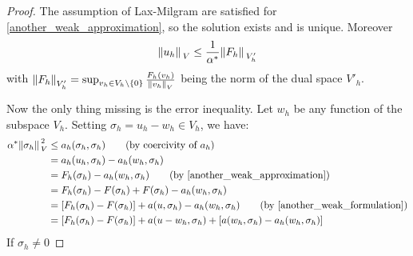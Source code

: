 \begin{proof}
    The assumption of Lax-Milgram are satisfied for \eqref{another_weak_approximation}, so the solution exists and is unique. Moreover
    \[
        \norm*{u_h}_V \leq \frac{1}{\alpha^*} \norm*{F_h}_{V'_h} 
    \]
    with \(\norm{F_h}_{V'_h} = \sup_{v_h \in V_h \backslash \left\{0\right\}} \frac{F_h(v_h)}{\norm{v_h}_V}\) being the norm of the dual space \(V'_h\).

    Now the only thing missing is the error inequality. Let \(w_h\) be any function of the subspace \(V_h\). Setting \(\sigma_h = u_h -w_h \in V_h\), we have:
    \begin{align*}
        \alpha^* \norm*{\sigma_h}^2_V &\leq a_h(\sigma_h, \sigma_h) \tag*{(by coercivity of \(a_h\))} \\
        &= a_h(u_h, \sigma_h) - a_h(w_h, \sigma_h) \\
        &= F_h(\sigma_h) - a_h(w_h, \sigma_h) \tag*{(by \eqref{another_weak_approximation})} \\
        &= F_h(\sigma_h) - F(\sigma_h) + F(\sigma_h) - a_h(w_h, \sigma_h) \\
        &= \left[F_h(\sigma_h)-F(\sigma_h)\right] + a(u, \sigma_h) - a_h(w_h, \sigma_h) \tag*{(by \eqref{another_weak_formulation})} \\
        &= \left[F_h(\sigma_h) - F(\sigma_h)\right] + a(u-w_h, \sigma_h) + \left[a(w_h, \sigma_h) - a_h(w_h, \sigma_h)\right]
    \end{align*}
    If \(\sigma_h \neq 0\)
\end{proof}